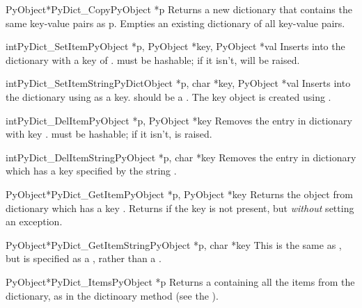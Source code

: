 \documentclass{manual}
\begin{document}
\begin{cfuncdesc}{PyObject*}{PyDict_Copy}{PyObject *p}
Returns a new dictionary that contains the same key-value pairs as p.
Empties an existing dictionary of all key-value pairs.
\end{cfuncdesc}

\begin{cfuncdesc}{int}{PyDict_SetItem}{PyObject *p, PyObject *key,
                                       PyObject *val}
Inserts  into the dictionary with a key of .
 must be hashable; if it isn't,  will be 
raised.
\end{cfuncdesc}

\begin{cfuncdesc}{int}{PyDict_SetItemString}{PyDictObject *p,
            char *key,
            PyObject *val}
Inserts  into the dictionary using 
as a key.  should be a .  The key object is
created using .
\end{cfuncdesc}

\begin{cfuncdesc}{int}{PyDict_DelItem}{PyObject *p, PyObject *key}
Removes the entry in dictionary  with key .
 must be hashable; if it isn't,  is
raised.
\end{cfuncdesc}

\begin{cfuncdesc}{int}{PyDict_DelItemString}{PyObject *p, char *key}
Removes the entry in dictionary  which has a key
specified by the string .
\end{cfuncdesc}

\begin{cfuncdesc}{PyObject*}{PyDict_GetItem}{PyObject *p, PyObject *key}
Returns the object from dictionary  which has a key
.  Returns \NULL{} if the key  is not present, but
\emph{without} setting an exception.
\end{cfuncdesc}

\begin{cfuncdesc}{PyObject*}{PyDict_GetItemString}{PyObject *p, char *key}
This is the same as , but  is
specified as a , rather than a .
\end{cfuncdesc}

\begin{cfuncdesc}{PyObject*}{PyDict_Items}{PyObject *p}
Returns a  containing all the items 
from the dictionary, as in the dictinoary method  (see
the ).
\end{cfuncdesc}
\end{document}
